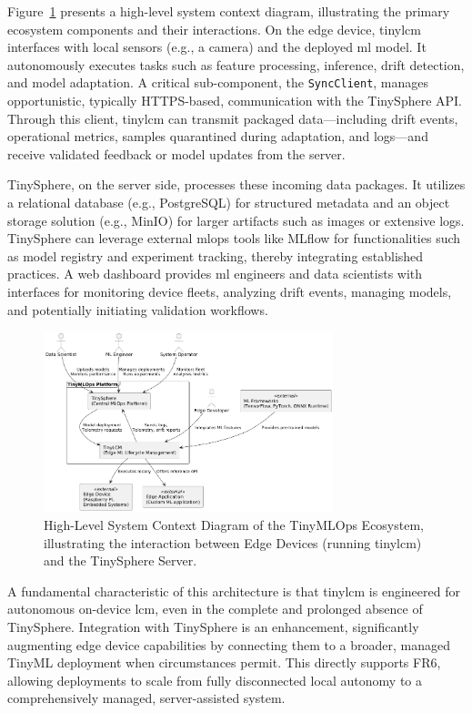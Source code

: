 Figure~\ref{fig:ecosystem_context_diagram} presents a high-level system context diagram, illustrating the primary ecosystem components and their interactions. On the edge device, \gls{tinylcm} interfaces with local sensors (e.g., a camera) and the deployed \gls{ml} model. It autonomously executes tasks such as feature processing, inference, drift detection, and model adaptation. A critical sub-component, the \texttt{SyncClient}, manages opportunistic, typically HTTPS-based, communication with the TinySphere API. Through this client, \gls{tinylcm} can transmit packaged data—including drift events, operational metrics, samples quarantined during adaptation, and logs—and receive validated feedback or model updates from the server.

TinySphere, on the server side, processes these incoming data packages. It utilizes a relational database (e.g., PostgreSQL) for structured metadata and an object storage solution (e.g., MinIO) for larger artifacts such as images or extensive logs. TinySphere can leverage external \gls{mlops} tools like MLflow for functionalities such as model registry and experiment tracking, thereby integrating established practices. A web dashboard provides \gls{ml} engineers and data scientists with interfaces for monitoring device fleets, analyzing drift events, managing models, and potentially initiating validation workflows.

\begin{figure}[htbp]
    \centering
    \includegraphics[width=0.75\textwidth]{figs/framework/system-context.png}
    \caption[High-Level System Context Diagram of the TinyMLOps Ecosystem]{High-Level System Context Diagram of the TinyMLOps Ecosystem, illustrating the interaction between Edge Devices (running \gls{tinylcm}) and the TinySphere Server.}
    \label{fig:ecosystem_context_diagram}
\end{figure}

A fundamental characteristic of this architecture is that \gls{tinylcm} is engineered for autonomous on-device \gls{lcm}, even in the complete and prolonged absence of TinySphere. Integration with TinySphere is an enhancement, significantly augmenting edge device capabilities by connecting them to a broader, managed TinyML deployment when circumstances permit. This directly supports FR6, allowing deployments to scale from fully disconnected local autonomy to a comprehensively managed, server-assisted system.


